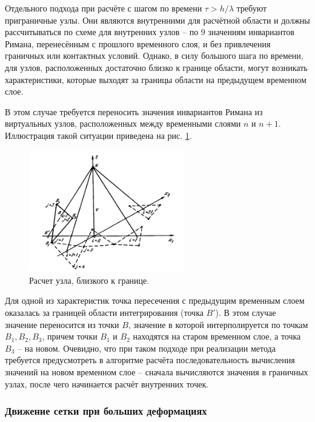 Отдельного подхода при расчёте с шагом по времени $\tau > h / \lambda$ требуют приграничные узлы. Они являются внутренними для расчётной области и должны рассчитываться по схеме для внутренних узлов -- по 9 значениям инвариантов Римана, перенесённым с прошлого временного слоя, и без привлечения граничных или контактных условий. Однако, в силу большого шага по времени, для узлов, расположенных достаточно близко к границе области, могут возникать характеристики, которые выходят за границы области на предыдущем временном слое.

В этом случае требуется переносить значения инвариантов Римана из виртуальных узлов, расположенных между временными слоями $n$ и $n+1$. Иллюстрация такой ситуации приведена на рис. \ref{pic:near_border_node}.

\begin{figure}[htp]
\centering
\includegraphics[width=0.6\textwidth]{png/characteristics-2d-triangles-semi-border.png}
\caption{Расчет узла, близкого к границе.}
\label{pic:near_border_node}
\end{figure}

Для одной из характеристик точка пересечения с предыдущим временным слоем оказалась за границей области интегрирования (точка $B'$). В этом случае значение переносится из точки $B$, значение в которой интерполируется по точкам $B_1, B_2, B_3$, причем точки $B_1$ и $B_2$ находятся на старом временном слое, а точка $B_3$ -- на новом. Очевидно, что при таком подходе при реализации метода требуется предусмотреть в алгоритме расчёта последовательность вычисления значений на новом временном слое -- сначала вычисляются значения в граничных узлах, после чего начинается расчёт внутренних точек.


\subsubsection{Движение сетки при больших деформациях}

